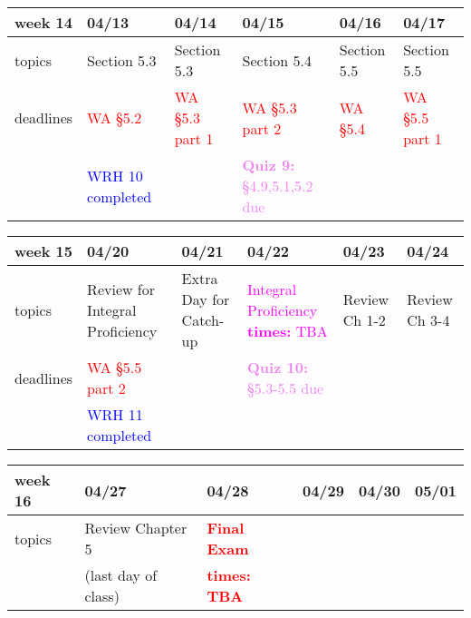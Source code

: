 \documentclass[11pt]{article}
\begin{document}
\begin{center}
\begin{tabularx}{\textwidth}{|p{1.5cm}|| L | L | L | L | L |}
\hline
week 14&04/13&04/14&04/15&04/16&04/17\\ \hline
topics &Section 5.3&Section 5.3&Section 5.4&Section 5.5&Section 5.5\\  \hline
deadlines&\textcolor{red}{WA \S 5.2}  &\textcolor{red}{WA \S 5.3 part 1}&\textcolor{red}{WA \S5.3 part 2}&\textcolor{red}{WA \S 5.4} & \textcolor{red}{WA \S 5.5 part 1}\\ 
&\textcolor{blue}{WRH 10 completed}&&\textcolor{violet}{\textbf{Quiz 9:} \S4.9,5.1,5.2 due }&&\\ \hline \end{tabularx} \end{center}

\begin{center}
\begin{tabularx}{\textwidth}{|p{1.5cm}|| L | L | L | L | L |}
\hline
week 15&04/20&04/21&04/22&04/23&04/24\\ \hline
topics&Review for Integral Proficiency&Extra Day for Catch-up&\textcolor{magenta}{Integral Proficiency \textbf{times:} TBA}&Review Ch 1-2&Review Ch 3-4\\ \hline
deadlines&\textcolor{red}{WA \S 5.5 part 2}&&\textcolor{violet}{\textbf{Quiz 10:} \S 5.3-5.5 due }&&\\ 
&\textcolor{blue}{WRH 11 completed}&&&& \\ \hline \end{tabularx} \end{center}

\begin{center}
\begin{tabularx}{\textwidth}{|p{1.5cm}|| L | L | L | L | L |}
\hline
week 16&04/27&04/28&04/29&04/30&05/01\\ \hline
topics&Review Chapter 5&\textcolor{red}{\textbf{Final Exam}} &&&\\ 
&(last day of class)&\textcolor{red}{\textbf{times: TBA}}&&&\\ \hline \hline
\end{tabularx} \end{center}
\end{document}
